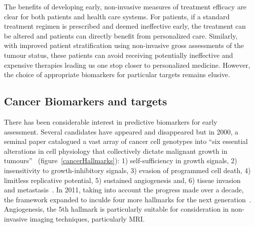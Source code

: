 The benefits of developing early, non-invasive measures of treatment efficacy are clear for both
patients and health care systems. For patients, if a standard treatment regimen is prescribed and
deemed ineffective early, the treatment can be altered and patients can directly benefit from
personalized care. Similarly, with improved patient stratification using non-invasive gross
assessments of the tumour status, these patients can avoid receiving potentially ineffective and
expensive therapies leading us one stop closer to personalized medicine. However, the choice of
appropriate biomarkers for particular targets remains elusive.

	\subsection{Cancer Biomarkers and targets}

	There has been considerable interest in predictive biomarkers for early assessment. Several
	candidates have appeared and disappeared but in 2000, a seminal paper catalogued a vast array of
	cancer cell genotypes into ``six essential alterations in cell physiology that collectively
	dictate malignant growth in tumours''~\cite{Hanahan:2000uv} (figure~\ref{cancerHallmarks}): 1)
	self-sufficiency in growth signals, 2) insensitivity to growth-inhibitory signals, 3) evasion of
	programmed cell death, 4) limitless replicative potential, 5) sustained angiogenesis and, 6)
	tissue invasion and metastasis~\cite{Hanahan:2000uv}. In 2011, taking into account the progress
	made over a decade, the framework expanded to inculde four more hallmarks for the next
	generation~\cite{Hanahan:2011gu}. Angiogenesis, the 5th hallmark is particularly suitable for
	consideration in non-invasive imaging techniques, particularly MRI.

